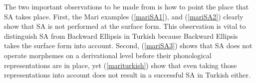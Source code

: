 The two important observations to be made from \cite{guseva2017postsyntactic} is how to point the place that SA takes place. First, the Mari examples  (\ref{mariSA1}), and (\ref{mariSA2}) clearly show that SA is not performed at the surface form. This observation is vital to distinguish SA from Backward Ellipsis in Turkish because Backward Ellipsis takes the surface form into account. Second, (\ref{mariSA3}) shows that SA does not operate morphemes on a derivational level before their phonological representations are in place, yet (\ref{mariturkish}) show that even taking those representations into account does not result in a successful SA in Turkish either. 